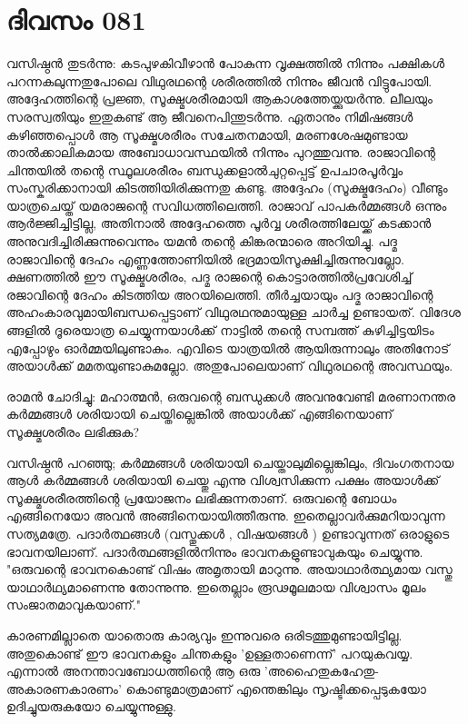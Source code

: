 \newpage
\section{ദിവസം 081}


വസിഷ്ഠന്‍ തുടര്‍ന്നു: കടപുഴകിവീഴാന്‍ പോകുന്ന വൃക്ഷത്തില്‍ നിന്നും പക്ഷികള്‍ പറന്നകലുന്നതുപോലെ വിഥുരഥന്റെ ശരീരത്തില്‍ നിന്നും ജീവന്‍ വിട്ടുപോയി. അദ്ദേഹത്തിന്റെ പ്രജ്ഞ, സൂക്ഷ്മശരീരമായി ആകാശത്തേയ്ക്കുയര്‍ന്നു. ലീലയും സരസ്വതിയും ഇതുകണ്ട്‌ ആ ജീവനെപിന്തുടര്‍ന്നു. ഏതാനും നിമിഷങ്ങള്‍ കഴിഞ്ഞപ്പൊള്‍ ആ സൂക്ഷ്മശരീരം സചേതനമായി, മരണശേഷമുണ്ടായ താല്‍ക്കാലികമായ അബോധാവസ്ഥയില്‍ നിന്നും  പുറത്തുവന്നു. രാജാവിന്റെ ചിന്തയില്‍ തന്റെ സ്ഥൂലശരീരം ബന്ധുക്കളാല്‍ചുറ്റപ്പെട്ട്‌ ഉപചാരപൂര്‍വ്വം സംസ്കരിക്കാനായി കിടത്തിയിരിക്കുന്നതു കണ്ടു. അദ്ദേഹം (സൂക്ഷ്മദേഹം) വീണ്ടും യാത്രചെയ്ത്‌ യമരാജന്റെ സവിധത്തിലെത്തി. രാജാവ്‌ പാപകര്‍മ്മങ്ങള്‍ ഒന്നും ആര്‍ജ്ജിച്ചിട്ടില്ല,  അതിനാല്‍ അദ്ദേഹത്തെ പൂര്‍വ്വ ശരീരത്തിലേയ്ക്ക്‌ കടക്കാന്‍ അനുവദിച്ചിരിക്കുന്നുവെന്നും യമന്‍ തന്റെ കിങ്കരന്മാരെ അറിയിച്ചു. പദ്മ രാജാവിന്റെ ദേഹം എണ്ണത്തോണിയില്‍ ഭദ്രമായിസൂക്ഷിച്ചിരുന്നുവല്ലോ. ക്ഷണത്തില്‍ ഈ സൂക്ഷ്മശരീരം, പദ്മ രാജന്റെ കൊട്ടാരത്തില്‍പ്രവേശിച്ച്‌ രജാവിന്റെ ദേഹം കിടത്തിയ   അറയിലെത്തി. തീര്‍ച്ചയായും പദ്മ രാജാവിന്റെ അഹംകാരവുമായിബന്ധപ്പെട്ടാണ്‌ വിഥുരഥനുമായുള്ള ചാര്‍ച്ച ഉണ്ടായത്‌. വിദേശ  ങ്ങളില്‍ ദൂരെയാത്ര ചെയ്യുന്നയാള്‍ക്ക് നാട്ടില്‍ തന്റെ സമ്പത്ത്  കുഴിച്ചിട്ടയിടം എപ്പോഴും ഓര്‍മ്മയിലുണ്ടാകും.   എവിടെ യാത്രയില്‍  ആയിരുന്നാലും അതിനോട്‌ അയാള്‍ക്ക്  മമതയുണ്ടാകുമല്ലോ. അതുപോലെയാണ്‌ വിഥുരഥന്റെ അവസ്ഥയും. 

രാമന്‍ ചോദിച്ചു: മഹാത്മന്‍, ഒരുവന്റെ ബന്ധുക്കള്‍ അവനുവേണ്ടി മരണാനന്തര കര്‍മ്മങ്ങള്‍ ശരിയായി ചെയ്തില്ലെങ്കില്‍ അയാള്‍ക്ക്‌ എങ്ങിനെയാണ്‌ സൂക്ഷ്മശരീരം ലഭിക്കുക?

വസിഷ്ഠന്‍ പറഞ്ഞു; കര്‍മ്മങ്ങള്‍ ശരിയായി ചെയ്താലുമില്ലെങ്കിലും, ദിവംഗതനായ ആള്‍ കര്‍മ്മങ്ങള്‍ ശരിയായി ചെയ്തു എന്നു വിശ്വസിക്കുന്ന പക്ഷം അയാള്‍ക്ക്‌ സൂക്ഷ്മശരീരത്തിന്റെ പ്രയോജനം ലഭിക്കുന്നതാണ്‌. ഒരുവന്റെ ബോധം എങ്ങിനെയോ അവന്‍ അങ്ങിനെയായിത്തീരുന്നു. ഇതെല്ലാവര്‍ക്കുമറിയാവുന്ന സത്യമത്രേ. പദാര്‍ത്ഥങ്ങള്‍ (വസ്തുക്കള്‍ , വിഷയങ്ങള്‍ ) ഉണ്ടാവുന്നത്‌ ഒരാളുടെ ഭാവനയിലാണ്‌. പദാര്‍ത്ഥങ്ങളില്‍നിന്നും ഭാവനകളുണ്ടാവുകയും ചെയ്യുന്നു. "ഒരുവന്റെ ഭാവനകൊണ്ട്‌ വിഷം അമൃതായി മാറുന്നു. അയാഥാര്‍ത്ഥ്യമായ വസ്തു യാഥാര്‍ഥ്യമാണെന്നു തോന്നുന്നു. ഇതെല്ലാം രൂഢമൂലമായ വിശ്വാസം മൂലം സംജാതമാവുകയാണ്‌."

കാരണമില്ലാതെ യാതൊരു കാര്യവും ഇന്നുവരെ ഒരിടത്തുമുണ്ടായിട്ടില്ല. അതുകൊണ്ട്‌ ഈ ഭാവനകളും ചിന്തകളും 'ഉള്ളതാണെന്ന്' പറയുകവയ്യ. എന്നാല്‍ അനന്താവബോധത്തിന്റെ ആ ഒരു 'അഹൈതുകഹേതു- അകാരണകാരണം' കൊണ്ടുമാത്രമാണ്‌ എന്തെങ്കിലും സൃഷ്ടിക്കപ്പെടുകയോ ഉദിച്ചുയരുകയോ ചെയ്യുന്നുള്ളു.

